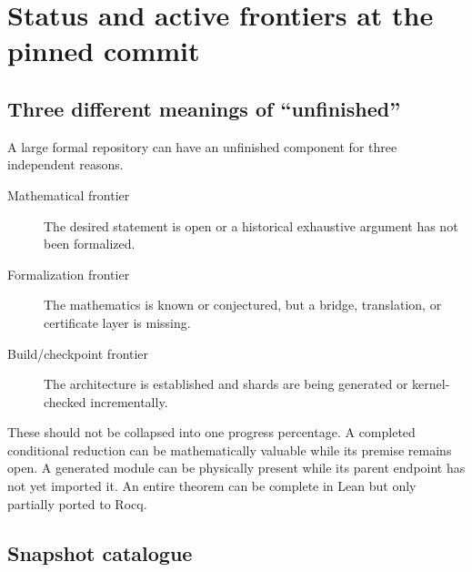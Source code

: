 \documentclass[
  10pt,
  a4paper,
  twoside,
  open=any,
  parskip=half,
  headings=big
]{scrreprt}
\begin{document}
\chapter{Status and active frontiers at the pinned commit}
\label{chap:frontiers}

\section{Three different meanings of ``unfinished''}

A large formal repository can have an unfinished component for three
independent reasons.

\begin{description}
  \item[Mathematical frontier] The desired statement is open or a historical
        exhaustive argument has not been formalized.
  \item[Formalization frontier] The mathematics is known or conjectured, but a
        bridge, translation, or certificate layer is missing.
  \item[Build/checkpoint frontier] The architecture is established and shards
        are being generated or kernel-checked incrementally.
\end{description}

These should not be collapsed into one progress percentage.  A completed
conditional reduction can be mathematically valuable while its premise remains
open.  A generated module can be physically present while its parent endpoint
has not yet imported it.  An entire theorem can be complete in Lean but only
partially ported to Rocq.

\section{Snapshot catalogue}
\end{document}
